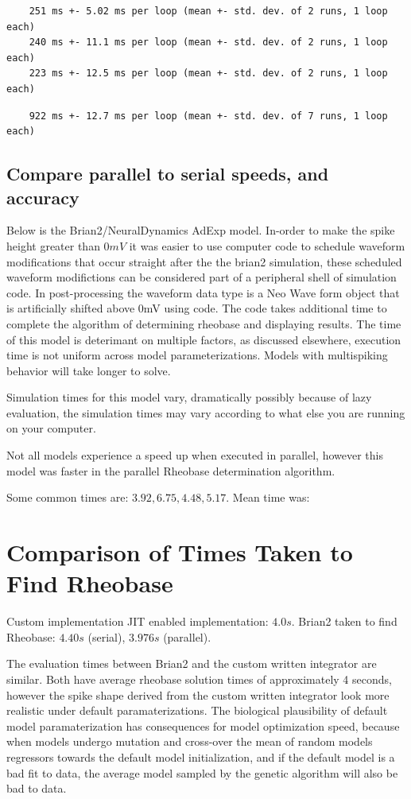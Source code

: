 \begin{verbatim}
    251 ms +- 5.02 ms per loop (mean +- std. dev. of 2 runs, 1 loop each)
    240 ms +- 11.1 ms per loop (mean +- std. dev. of 2 runs, 1 loop each)
    223 ms +- 12.5 ms per loop (mean +- std. dev. of 2 runs, 1 loop each)
\end{verbatim}

\begin{verbatim}
    922 ms +- 12.7 ms per loop (mean +- std. dev. of 7 runs, 1 loop each)
\end{verbatim}

\subsection{Compare parallel to serial speeds, and accuracy}

Below is the Brian2/NeuralDynamics AdExp model. In-order to make the spike height greater than $0mV$ it was easier to use computer code to schedule waveform modifications that occur straight after the the brian2 simulation, these scheduled waveform modifictions can be considered part of a peripheral shell of simulation code. In post-processing
the waveform data type is a Neo Wave form object that is artificially
shifted above 0mV using code. The code takes additional time to complete
the algorithm of determining rheobase and displaying results. The time
of this model is deterimant on multiple factors, as discussed elsewhere,
execution time is not uniform across model parameterizations. Models
with multispiking behavior will take longer to solve.

Simulation times for this model vary, dramatically possibly because of
lazy evaluation, the simulation times may vary according to what else
you are running on your computer.

Not all models experience a speed up when executed in parallel, however
this model was faster in the parallel Rheobase determination algorithm.

Some common times are: $3.92,6.75,4.48,5.17$. Mean time was:

\section{Comparison of Times Taken to Find Rheobase}
Custom implementation JIT enabled implementation: $4.0s$. 
Brian2 taken to find Rheobase: $4.40s$ (serial), $3.976s$ (parallel).

The evaluation times between Brian2 and the custom written
integrator are similar. Both have average rheobase solution times of approximately 4 seconds, however the spike shape derived from the custom written integrator look more realistic under default paramaterizations. The biological plausibility of default model paramaterization has consequences for model optimization speed, because when  models undergo mutation and cross-over the mean of random models regressors towards the default model initialization, and if the default model is a bad fit to data, the average model sampled by the genetic algorithm will also be bad to data.\\

